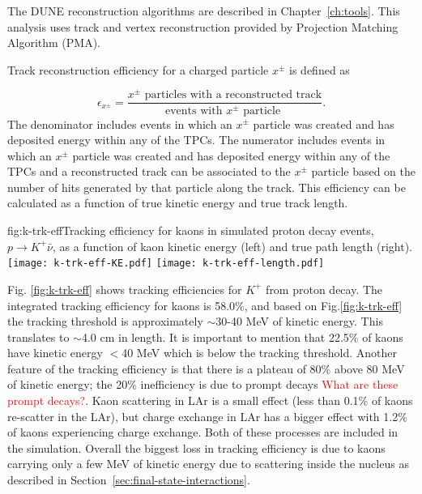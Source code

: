 The DUNE reconstruction algorithms are described in Chapter~\ref{ch:tools}.  This analysis uses \threed track and vertex reconstruction provided by Projection Matching Algorithm (PMA).

Track reconstruction efficiency for a charged particle $x^{\pm}$ is defined as 

\begin{equation}
\epsilon_{x^{\pm}} = \frac{\mbox{$x^{\pm}$ particles with a reconstructed track}}{\mbox{events with $x^{\pm}$ particle }}.
\end{equation}
The denominator includes events in which an $x^{\pm}$ particle was created and has deposited energy within any of the TPCs.  The numerator includes events in which an $x^{\pm}$ particle was created and has deposited energy within any of the TPCs and a reconstructed track can be associated to the $x^{\pm}$ particle based on the number of hits generated by that particle along the track. This efficiency can be calculated as a function of true kinetic energy and true track length.

\begin{dunefigure}{fig:k-trk-eff}{Tracking efficiency for kaons in simulated proton decay events, $p\rightarrow K^{+} \bar{\nu}$, as a function of kaon kinetic energy (left) and true path length (right).}
\texttt{[image: k-trk-eff-KE.pdf]}
\texttt{[image: k-trk-eff-length.pdf]}
\end{dunefigure}

Fig. \ref{fig:k-trk-eff} shows tracking efficiencies for $K^{+}$  from proton decay. The integrated tracking efficiency for kaons is 58.0$\%$, and based on Fig.\ref{fig:k-trk-eff} the tracking threshold is approximately $\sim$30-40 MeV of kinetic energy. This translates to $\sim$4.0 cm in length. It is important to mention that 22.5$\%$ of kaons have kinetic energy $<$40 MeV which is below the tracking threshold. Another feature of the tracking efficiency is that there is a plateau of $80\%$ above 80 MeV of kinetic energy; the 20$\%$ inefficiency is due to prompt decays \textcolor{red}{What are these prompt decays?}. Kaon scattering in LAr is a small effect (less than 0.1$\%$ of kaons re-scatter in the LAr), but charge exchange in LAr has a bigger effect with 1.2$\%$ of kaons experiencing charge exchange. Both of these processes are included in the simulation.  Overall the biggest loss in tracking efficiency is due to kaons carrying only a few MeV of kinetic energy due to scattering inside the nucleus as described in Section~\ref{sec:final-state-interactions}.

